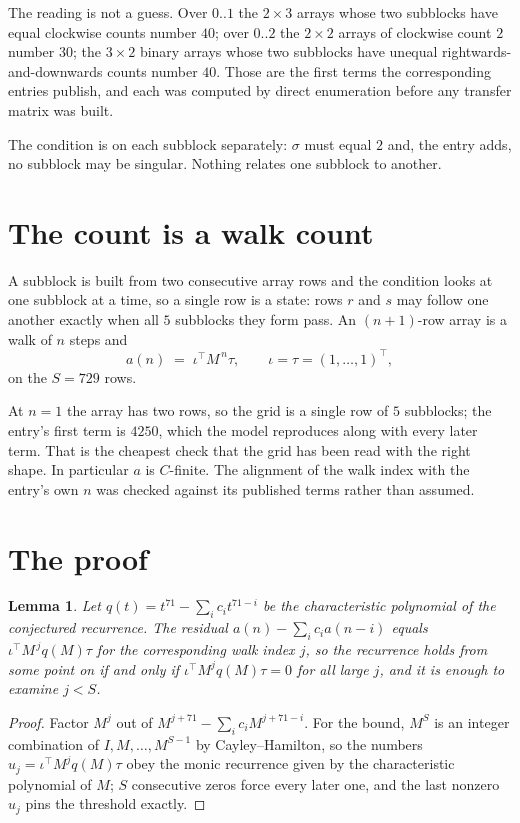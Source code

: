 \documentclass[11pt,a4paper]{article}
\theoremstyle{plain}
\newtheorem{lemma}[theorem]{Lemma}
\theoremstyle{definition}
\begin{document}
The reading is not a guess. Over $0..1$ the $2\times3$ arrays whose two subblocks have equal
clockwise counts number $40$; over $0..2$ the $2\times2$ arrays of clockwise count $2$ number
$30$; the $3\times2$ binary arrays whose two subblocks have unequal rightwards-and-downwards
counts number $40$. Those are the first terms the corresponding entries publish, and each was
computed by direct enumeration before any transfer matrix was built.

The condition is on each subblock separately: $\sigma$ must equal $2$ and, the entry adds, no subblock may be singular. Nothing
relates one subblock to another.

\section{The count is a walk count}

A subblock is built from two consecutive array rows and the condition looks
at one subblock at a time, so a single row is a state: rows $r$ and $s$ may follow one another
exactly when all $5$ subblocks they form pass. An $(n+1)$-row array is a walk of $n$ steps and
\[
a(n)\;=\;\iota^{\!\top}M^{\,n}\tau,\qquad\iota=\tau=(1,\dots,1)^{\!\top},
\]
on the $S=729$ rows.

At $n=1$ the array has two rows, so the grid is a single row of $5$
subblocks; the entry's first term is $4250$, which the model
reproduces along with every later term. That is the cheapest check that the grid has been read
with the right shape.
In particular $a$ is $C$-finite. The alignment of the walk index with the entry's own $n$ was
checked against its published terms rather than assumed.

\section{The proof}

\begin{lemma}\label{lem:crit}
Let $q(t)=t^{71}-\sum_i c_it^{71-i}$ be the characteristic polynomial of the
conjectured recurrence. The residual $a(n)-\sum_ic_ia(n-i)$ equals
$\iota^{\!\top}M^{\,j}q(M)\tau$ for the corresponding walk index $j$, so the recurrence
holds from some point on if and only if $\iota^{\!\top}M^{j}q(M)\tau=0$ for all large $j$,
and it is enough to examine $j<S$.
\end{lemma}

\begin{proof}
Factor $M^{j}$ out of $M^{j+71}-\sum_ic_iM^{j+71-i}$. For the bound, $M^{S}$
is an integer combination of $I,M,\dots,M^{S-1}$ by Cayley--Hamilton, so the numbers
$u_j=\iota^{\!\top}M^{j}q(M)\tau$ obey the monic recurrence given by the characteristic
polynomial of $M$; $S$ consecutive zeros force every later one, and the last nonzero $u_j$
pins the threshold exactly.
\end{proof}
\end{document}
